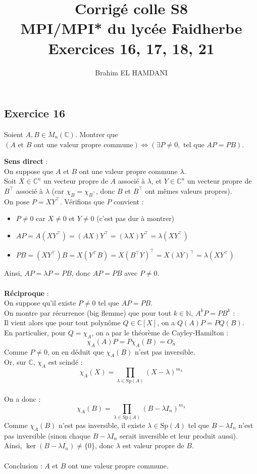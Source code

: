 \documentclass[a4paper,12pt]{article}
\title{Corrigé colle S8 \\
	MPI/MPI* du lycée Faidherbe \\
	\large Exercices 16, 17, 18, 21}
\author{Brahim EL HAMDANI}
\begin{document}
	\maketitle
	
	\subsection*{Exercice 16}
    Soient $A, B \in M_n(\mathbb{C})$.
	Montrer que $(A \text{ et } B \text{ ont une valeur propre commune}) \iff (\exists P \neq 0, \text{ tel que } AP = PB)$.
	
	\begin{correctionbox}
		\textbf{Sens direct} : \\
		On suppose que $A$ et $B$ ont une valeur propre commune $\lambda$. \\
		Soit $X \in \mathbb{C}^n$ un vecteur propre de $A$ associé à $\lambda$, et $Y \in \mathbb{C}^n$ un vecteur propre de $B^\top$ associé à $\lambda$ (car  $\chi_B = \chi_{B^\top}$, donc $B$ et $B^\top$ ont mêmes valeurs propres). \\
		On pose $P = X Y^\top$. Vérifions que $P$ convient :
		\begin{itemize}
			\item $P \neq 0$ car $X \neq 0$ et $Y \neq 0$ (c'est pas dur à montrer)
			\item $AP = A(X Y^\top) = (AX) Y^\top = (\lambda X) Y^\top = \lambda (X Y^\top)$
			\item $PB = (X Y^\top) B = X (Y^\top B) = X (B^\top Y)^\top = X (\lambda Y)^\top = \lambda (X Y^\top)$
		\end{itemize}
		Ainsi, $AP = \lambda P = PB$, donc $AP = PB$ avec $P \neq 0$.	
		\\\\
		\textbf{Réciproque} : \\
		On suppose qu'il existe $P \neq 0$ tel que $AP = PB$. \\ On montre par récurrence (big flemme) que pour tout $k \in \mathbb{N}$, $A^k P = P B^k$ :\\ Il vient alors que pour tout polynôme $Q \in \mathbb{C}[X]$, on a $Q(A)P = P Q(B)$.\\En particulier, pour $Q = \chi_A$, on a par le théorème de Cayley-Hamilton :
		$$\chi_A(A) P = P \chi_A(B) = O_n$$
		Comme $P \neq 0$, on en déduit que $\chi_A(B)$ n'est pas inversible. \\
		
		Or, sur $\mathbb{C}$, $\chi_A$ est scindé :
		$$\chi_A(X) = \prod_{\lambda \in \mathrm{Sp}(A)} (X - \lambda)^{m_\lambda}$$\\
		
		On a donc :
		$$\chi_A(B) = \prod_{\lambda \in \mathrm{Sp}(A)} (B - \lambda I_n)^{m_\lambda}$$
		Comme $\chi_A(B)$ n'est pas inversible, il existe $\lambda \in \mathrm{Sp}(A)$ tel que $B - \lambda I_n$ n'est pas inversible (sinon chaque $B - \lambda I_n$ serait inversible et leur produit aussi). \\ Ainsi, $\ker(B - \lambda I_n) \neq \{0\}$, donc $\lambda$ est valeur propre de $B$. \\\\Conclusion : $A$ et $B$ ont une valeur propre commune.
	\end{correctionbox}
\end{document}
